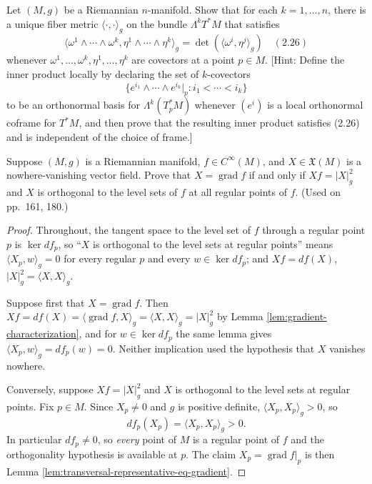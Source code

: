 \begin{exercise}
\label{prob:fiber-metric-exterior-powers}


Let $(M, g)$ be a Riemannian $n$-manifold. Show that for each $k = 1, \ldots, n$, there is a unique fiber metric $\langle \cdot, \cdot \rangle_g$ on the bundle $\Lambda^k T^* M$ that satisfies
\[
\langle \omega^1 \wedge \cdots \wedge \omega^k, \eta^1 \wedge \cdots \wedge \eta^k \rangle_g = \det\left(\langle \omega^i, \eta^j \rangle_g\right) \quad (2.26)
\]
whenever $\omega^1, \ldots, \omega^k, \eta^1, \ldots, \eta^k$ are covectors at a point $p \in M$. [Hint: Define the inner product locally by declaring the set of $k$-covectors
\[
\{e^{i_1} \wedge \cdots \wedge e^{i_k} |_p : i_1 < \cdots < i_k\}
\]
to be an orthonormal basis for $\Lambda^k(T_p^* M)$ whenever $(e^i)$ is a local orthonormal coframe for $T^* M$, and then prove that the resulting inner product satisfies (2.26) and is independent of the choice of frame.]
\end{exercise}

\begin{exercise}\label{prob:gradient-characterization}


Suppose $(M,g)$ is a Riemannian manifold, $f \in C^\infty(M)$, and $X \in \mathfrak{X}(M)$ is a nowhere-vanishing vector field. Prove that $X = \operatorname{grad} f$ if and only if $Xf = |X|_g^2$ and $X$ is orthogonal to the level sets of $f$ at all regular points of $f$. (Used on pp.~161, 180.)
\end{exercise}
\begin{proof}

Throughout, the tangent space to the level set of $f$ through a regular point $p$ is $\ker df_p$, so ``$X$ is orthogonal to the level sets at regular points'' means $\langle X_p, w\rangle_g = 0$ for every regular $p$ and every $w \in \ker df_p$; and $Xf = df(X)$, $|X|_g^2 = \langle X, X\rangle_g$.

Suppose first that $X = \operatorname{grad} f$. Then $Xf = df(X) = \langle \operatorname{grad} f, X\rangle_g = \langle X, X\rangle_g = |X|_g^2$ by Lemma \ref{lem:gradient-characterization}, and for $w \in \ker df_p$ the same lemma gives $\langle X_p, w\rangle_g = df_p(w) = 0$. Neither implication used the hypothesis that $X$ vanishes nowhere.

Conversely, suppose $Xf = |X|_g^2$ and $X$ is orthogonal to the level sets at regular points. Fix $p \in M$. Since $X_p \neq 0$ and $g$ is positive definite, $\langle X_p, X_p\rangle_g > 0$, so
\[
df_p(X_p) = \langle X_p, X_p \rangle_g > 0 .
\]
In particular $df_p \neq 0$, so \emph{every} point of $M$ is a regular point of $f$ and the orthogonality hypothesis is available at $p$. The claim $X_p = \operatorname{grad} f|_p$ is then Lemma \ref{lem:transversal-representative-eq-gradient}.
\end{proof}

